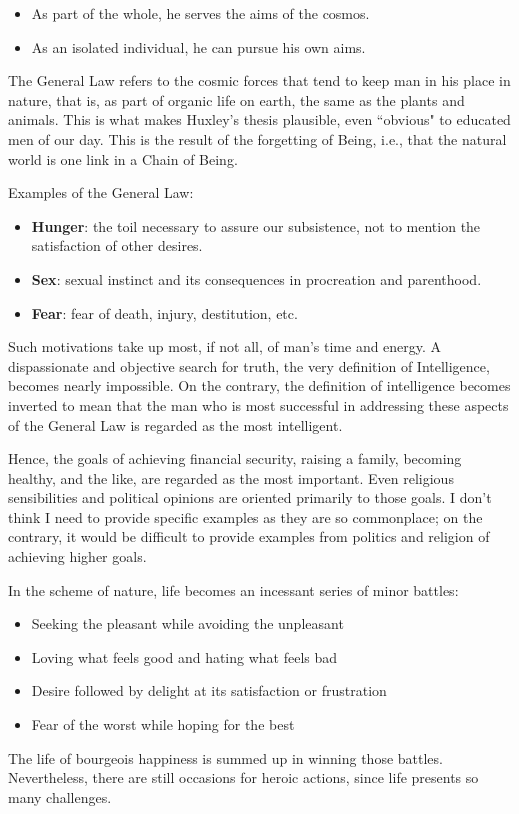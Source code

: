 \begin{itemize}
\item As part of the whole, he serves the aims of the cosmos. 
\item As an isolated individual, he can pursue his own aims. 
\end{itemize}
The General Law refers to the cosmic forces that tend to keep man in his place in nature, that is, as part of organic life on earth, the same as the plants and animals. This is what makes Huxley's thesis plausible, even ``obvious" to educated men of our day. This is the result of the forgetting of Being, i.e., that the natural world is one link in a Chain of Being.

Examples of the General Law:

\begin{itemize}
\item \textbf{Hunger}: the toil necessary to assure our subsistence, not to mention the satisfaction of other desires. 
\item \textbf{Sex}: sexual instinct and its consequences in procreation and parenthood. 
\item \textbf{Fear}: fear of death, injury, destitution, etc. 
\end{itemize}
Such motivations take up most, if not all, of man's time and energy. A dispassionate and objective search for truth, the very definition of Intelligence, becomes nearly impossible. On the contrary, the definition of intelligence becomes inverted to mean that the man who is most successful in addressing these aspects of the General Law is regarded as the most intelligent.

Hence, the goals of achieving financial security, raising a family, becoming healthy, and the like, are regarded as the most important. Even religious sensibilities and political opinions are oriented primarily to those goals. I don't think I need to provide specific examples as they are so commonplace; on the contrary, it would be difficult to provide examples from politics and religion of achieving higher goals.

In the scheme of nature, life becomes an incessant series of minor battles:

\begin{itemize}
\item Seeking the pleasant while avoiding the unpleasant 
\item Loving what feels good and hating what feels bad 
\item Desire followed by delight at its satisfaction or frustration 
\item Fear of the worst while hoping for the best 
\end{itemize}
The life of bourgeois happiness is summed up in winning those battles. Nevertheless, there are still occasions for heroic actions, since life presents so many challenges.

